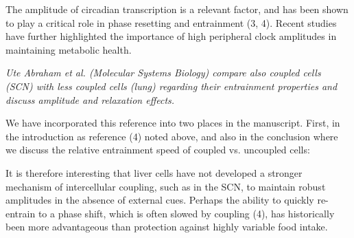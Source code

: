 \documentclass[11pt, letterpaper]{article}
\newenvironment{reviewer}{\itshape\color{gray}}{}
\newenvironment{manuscript}[1]{\begin{center}\begin{tcolorbox}[colback=green!5!white,colframe=green!75!black,width=0.8\textwidth,title={#1},breakable,fonttitle=\bfseries]}{\end{tcolorbox}\end{center}}
\begin{document}
\begin{manuscript}{Page 2}
The amplitude of circadian transcription is a relevant factor, and has been shown to play a critical role in phase resetting and entrainment (3, 4).
Recent studies have further highlighted the importance of high peripheral clock amplitudes in maintaining metabolic health.
\end{manuscript}

\begin{reviewer}
Ute Abraham et al. (Molecular Systems Biology) compare also coupled cells (SCN) with less coupled cells (lung) regarding their entrainment properties and discuss amplitude and relaxation effects.
\end{reviewer}

We have incorporated this reference into two places in the manuscript. First, in the introduction as reference (4) noted above, and also in the conclusion where we discuss the relative entrainment speed of coupled vs. uncoupled cells:

\begin{manuscript}{Page 18}
It is therefore interesting that liver cells have not developed a stronger mechanism of intercellular coupling, such as in the SCN, to maintain robust amplitudes in the absence
of external cues.
Perhaps the ability to quickly re-entrain to a phase shift, which is often slowed by coupling (4), has historically been more advantageous than protection against highly variable food intake.
\end{manuscript}
\end{document}
